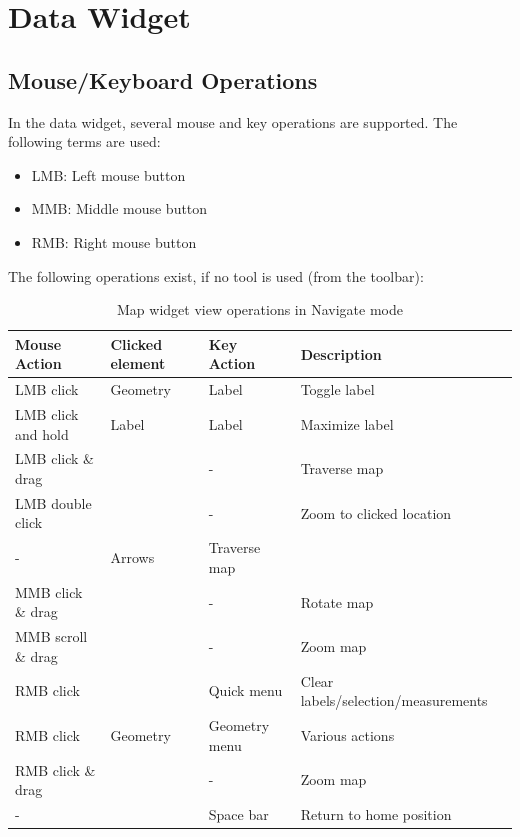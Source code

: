 \section{Data Widget}
\label{sec:geoview_data}

\subsection{Mouse/Keyboard Operations}
In the data widget, several mouse and key operations are supported. The following terms are used:

\begin{itemize}
 \item LMB: Left mouse button
 \item MMB: Middle mouse button
 \item RMB: Right mouse button
\end{itemize}

The following operations exist, if no tool is used (from the toolbar):

\begin{table}[H]
  \center
  \begin{tabular}{ | l | l | l | l |}
    \hline
    \textbf{Mouse Action} & \textbf{Clicked element} &\textbf{Key Action} &  \textbf{Description} \\ \hline
    LMB click & Geometry & Label & Toggle label \\ \hline
    LMB click and hold & Label & Label & Maximize label \\ \hline
    LMB click \& drag & & - & Traverse map \\ \hline
    LMB double click & & - & Zoom to clicked location \\ \hline
    - & Arrows & Traverse map \\ \hline
    MMB click \& drag & & - & Rotate map \\ \hline
    MMB scroll \& drag & & - & Zoom map \\ \hline
    RMB click & & Quick menu & Clear labels/selection/measurements \\ \hline
    RMB click & Geometry & Geometry menu & Various actions \\ \hline
    RMB click \& drag & & - & Zoom map \\ \hline
    - & & Space bar & Return to home position \\ \hline
  \end{tabular}
  \caption{Map widget view operations in Navigate mode}
\end{table}


